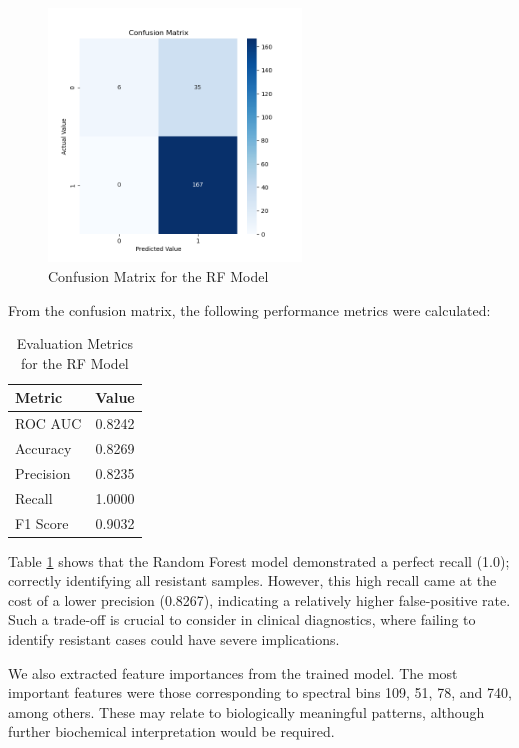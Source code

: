 \documentclass{article}
\begin{document}
\begin{figure}[h]
  \centering
  \includegraphics[width=0.6\textwidth]{confusion_matrix_Random_Forest.png}
  \caption{Confusion Matrix for the RF Model}
  \label{fig:rf_confusion_matrix}
\end{figure}

From the confusion matrix, the following performance metrics were calculated:

\begin{table}[h]
\centering
\caption{Evaluation Metrics for the RF Model}
\label{tab:Random Forest Performance Metrics}
\begin{tabular}{|l|c|}
\hline
\textbf{Metric} & \textbf{Value} \\
\hline
ROC AUC   & 0.8242 \\
Accuracy  & 0.8269 \\
Precision & 0.8235 \\
Recall    & 1.0000 \\
F1 Score  & 0.9032 \\
\bottomrule
\end{tabular}
\end{table}

Table \ref{tab:Random Forest Performance Metrics} shows that the Random Forest model demonstrated a perfect recall (1.0); correctly identifying all resistant samples. However, this high recall came at the cost of a lower precision (0.8267), indicating a relatively higher false-positive rate. Such a trade-off is crucial to consider in clinical diagnostics, where failing to identify resistant cases could have severe implications.

We also extracted feature importances from the trained model. The most important features were those corresponding to spectral bins 109, 51, 78, and 740, among others. These may relate to biologically meaningful patterns, although further biochemical interpretation would be required.
\end{document}
